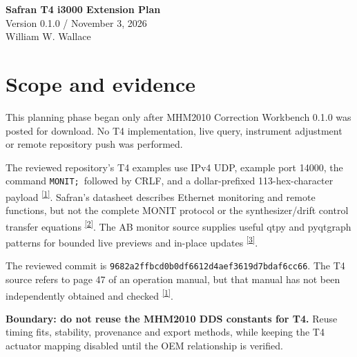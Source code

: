 \documentclass[11pt,a4paper]{article}
\newcommand{\codecite}{\textsuperscript{\href{https://raw.githubusercontent.com/Braveheart53/GBO_Maser_Control/main/T4_Maser_Comms.py}{[1]}}}
\newcommand{\datacite}{\textsuperscript{\href{https://safran-navigation-timing.com/wp-content/uploads/2024/03/SAFRAN_IMASER-3000_Datasheet_3-11-2024_US.pdf}{[2]}}}
\newcommand{\repocite}{\textsuperscript{\href{https://github.com/Braveheart53/GBO_Maser_Control/tree/main}{[3]}}}
\begin{document}
\begin{center}
{\LARGE\bfseries Safran T4 i3000 Extension Plan}\\[5pt]
{\large Version 0.1.0 / November 3, 2026}\\[4pt]
William W. Wallace
\end{center}
\section{Scope and evidence}
This planning phase began only after MHM2010 Correction Workbench 0.1.0 was
posted for download. No T4 implementation, live query, instrument adjustment
or remote repository push was performed.

The reviewed repository's T4 examples use IPv4 UDP, example port 14000, the
command \texttt{MONIT;}\ followed by CRLF, and a dollar-prefixed 113-hex-character
payload \codecite. Safran's datasheet describes Ethernet monitoring and remote
functions, but not the complete MONIT protocol or the synthesizer/drift control
transfer equations \datacite. The AB monitor source supplies useful qtpy and
pyqtgraph patterns for bounded live previews and in-place updates \repocite.

The reviewed commit is
\texttt{9682a2ffbcd0b0df6612d4aef3619d7bdaf6cc66}. The T4 source refers to
page 47 of an operation manual, but that manual has not been independently
obtained and checked \codecite.

\textbf{Boundary: do not reuse the MHM2010 DDS constants for T4.}
Reuse timing fits, stability, provenance and export methods, while keeping
the T4 actuator mapping disabled until the OEM relationship is verified.
\end{document}
